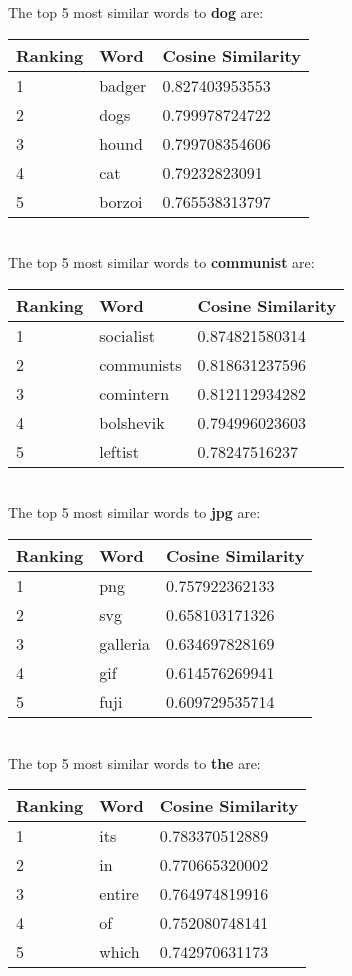 \documentclass{article}
\begin{document}
\noindent
The top 5 most similar words to \textbf{dog} are:\\
\begin{tabular}{ p{2.5cm}|p{2.5cm}|p{3cm}  }
 \hline
 Ranking & Word & Cosine Similarity\\
 \hline
1 & badger & 0.827403953553\\
2 & dogs & 0.799978724722\\
3 & hound & 0.799708354606\\
4 & cat & 0.79232823091\\
5 & borzoi & 0.765538313797\\
 \hline
\end{tabular}\\

\noindent
The top 5 most similar words to \textbf{communist} are:\\
\begin{tabular}{ p{2.5cm}|p{2.5cm}|p{3cm}  }
 \hline
 Ranking & Word & Cosine Similarity\\
 \hline
1 & socialist & 0.874821580314\\
2 & communists & 0.818631237596\\
3 & comintern & 0.812112934282\\
4 & bolshevik & 0.794996023603\\
5 & leftist & 0.78247516237\\
 \hline
\end{tabular}\\

\noindent
The top 5 most similar words to \textbf{jpg} are:\\
\begin{tabular}{ p{2.5cm}|p{2.5cm}|p{3cm}  }
 \hline
 Ranking & Word & Cosine Similarity\\
 \hline
1 & png & 0.757922362133\\
2 & svg & 0.658103171326\\
3 & galleria & 0.634697828169\\
4 & gif & 0.614576269941\\
5 & fuji & 0.609729535714\\
 \hline
\end{tabular}\\

\noindent
The top 5 most similar words to \textbf{the} are:\\
\begin{tabular}{ p{2.5cm}|p{2.5cm}|p{3cm}  }
 \hline
 Ranking & Word & Cosine Similarity\\
 \hline
1 & its & 0.783370512889\\
2 & in & 0.770665320002\\
3 & entire & 0.764974819916\\
4 & of & 0.752080748141\\
5 & which & 0.742970631173\\
 \hline
\end{tabular}\\
\end{document}
